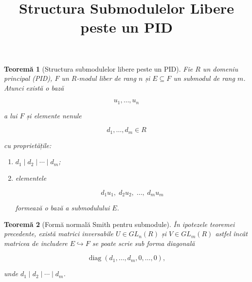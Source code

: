\documentclass[12pt]{article}
\title{Structura Submodulelor Libere peste un PID}
\author{}
\date{}
\theoremstyle{definition}
\theoremstyle{plain}
\newtheorem{theorem}{Teoremă}
\begin{document}
\maketitle

\begin{theorem}[Structura submodulelor libere peste un PID]
Fie $R$ un domeniu principal (PID), $F$ un $R$-modul liber de rang $n$ și
$E \subseteq F$ un submodul de rang $m$. Atunci există o bază


\[
u_1, \dots, u_n
\]


a lui $F$ și elemente nenule


\[
d_1, \dots, d_m \in R
\]


cu proprietățile:
\begin{enumerate}
    \item[(i)] $d_1 \mid d_2 \mid \cdots \mid d_m$;
    \item[(ii)] elementele
    

\[
    d_1 u_1,\; d_2 u_2,\; \dots,\; d_m u_m
    \]


    formează o bază a submodulului $E$.
\end{enumerate}
\end{theorem}

\begin{theorem}[Formă normală Smith pentru submodule]
În ipotezele teoremei precedente, există matrici inversabile
$U \in GL_n(R)$ și $V \in GL_m(R)$ astfel încât matricea de includere
$E \hookrightarrow F$ se poate scrie sub forma diagonală


\[
\operatorname{diag}(d_1, \dots, d_m, 0, \dots, 0),
\]


unde $d_1 \mid d_2 \mid \cdots \mid d_m$.
\end{theorem}
\end{document}
